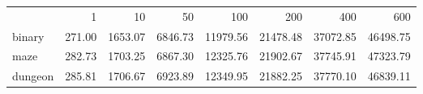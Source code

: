 \begin{tabular}{lrrrrrrr}
 & 1 & 10 & 50 & 100 & 200 & 400 & 600 \\
binary & 271.00 & 1653.07 & 6846.73 & 11979.56 & 21478.48 & 37072.85 & 46498.75 \\
maze & 282.73 & 1703.25 & 6867.30 & 12325.76 & 21902.67 & 37745.91 & 47323.79 \\
dungeon & 285.81 & 1706.67 & 6923.89 & 12349.95 & 21882.25 & 37770.10 & 46839.11 \\
\end{tabular}
